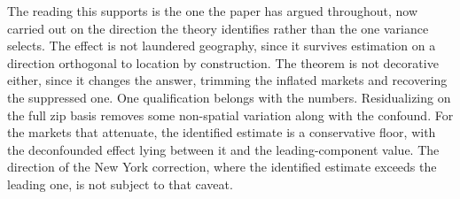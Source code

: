 The reading this supports is the one the paper has argued throughout, now carried
out on the direction the theory identifies rather than the one variance selects.
The effect is not laundered geography, since it survives estimation on a direction
orthogonal to location by construction. The theorem is not decorative either, since it
changes the answer, trimming the inflated markets and recovering the suppressed one.
One qualification belongs with the numbers. Residualizing on the full zip basis
removes some non-spatial variation along with the confound. For the markets that
attenuate, the identified estimate is a conservative floor, with the deconfounded
effect lying between it and the leading-component value. The direction of the New
York correction, where the identified estimate exceeds the leading one, is not
subject to that caveat.

